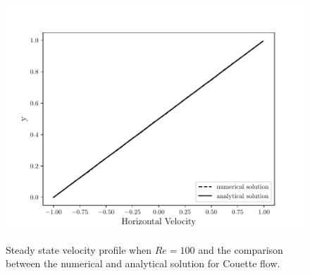 \begin{figure}[H]
     \centering
     \includegraphics[scale=1]{./02_chaps/cap_validation/figure/couette_velocity.pdf}\\
     \medskip
     \caption{Steady state velocity profile when $Re=100$ and
     the comparison between the numerical and analytical solution 
     for Couette flow.}
     \label{velocidade couette}
\end{figure}

